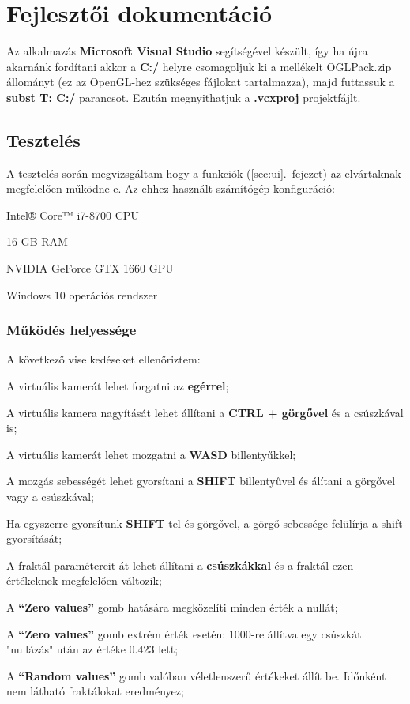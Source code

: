 \chapter{Fejlesztői dokumentáció} 
\label{ch:impl}

Az alkalmazás \textbf{Microsoft Visual Studio} segítségével készült, így ha újra akarnánk fordítani akkor a \textbf{C:/} helyre csomagoljuk ki a mellékelt OGLPack.zip állományt (ez az OpenGL-hez szükséges fájlokat tartalmazza), majd futtassuk a \textbf{subst T: C:/} parancsot. Ezután megnyithatjuk a \textbf{.vcxproj} projektfájlt.

\section{Tesztelés}

A tesztelés során megvizsgáltam hogy a funkciók (\ref{sec:ui}.~fejezet) az elvártaknak megfelelően működne-e. Az ehhez használt számítógép konfiguráció:
\begin{compactitem}
	\item Intel® Core™ i7-8700 CPU
	\item 16 GB RAM
	\item NVIDIA GeForce GTX 1660 GPU
	\item Windows 10 operációs rendszer
\end{compactitem}

\subsection{Működés helyessége}

A következő viselkedéseket ellenőriztem:
\begin{compactenum}
	\item A virtuális kamerát lehet forgatni az \textbf{egérrel};
	\item A virtuális kamera nagyítását lehet állítani a \textbf{CTRL + görgővel} és a csúszkával is;
	\item A virtuális kamerát lehet mozgatni a \textbf{WASD} billentyűkkel;
	\item A mozgás sebességét lehet gyorsítani a \textbf{SHIFT} billentyűvel és álítani a görgővel vagy a csúszkával;
	\item Ha egyszerre gyorsítunk \textbf{SHIFT}-tel és görgővel, a görgő sebessége felülírja a shift gyorsítását;
	\item A fraktál paramétereit át lehet állítani a \textbf{csúszkákkal} és a fraktál ezen értékeknek megfelelően változik;
	\item A \textbf{``Zero values''} gomb hatására megközelíti minden érték a nullát;
	\item A \textbf{``Zero values''} gomb extrém érték esetén: 1000-re állítva egy csúszkát "nullázás" után az értéke 0.423 lett;
	\item A \textbf{``Random values''} gomb valóban véletlenszerű értékeket állít be. Időnként nem látható fraktálokat eredményez;
\end{compactenum}

